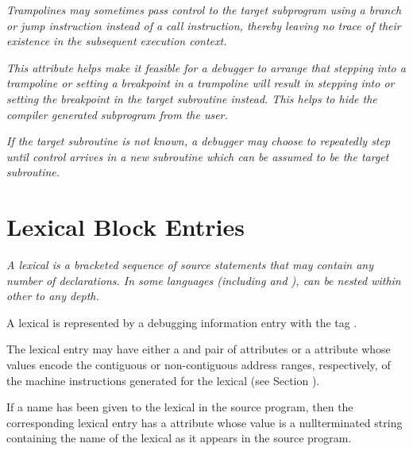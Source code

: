 \textit{Trampolines may sometimes pass control to the target
subprogram using a branch or jump instruction instead of a
call instruction, thereby leaving no trace of their existence
in the subsequent execution context. }

\textit{This attribute helps make it feasible for a debugger to arrange
that stepping into a trampoline or setting a breakpoint in
a trampoline will result in stepping into or setting the
breakpoint in the target subroutine instead. This helps to
hide the compiler generated subprogram from the user. }

\textit{If the target subroutine is not known, a debugger may choose
to repeatedly step until control arrives in a new subroutine
which can be assumed to be the target subroutine. }



\section{Lexical Block Entries}
\label{chap:lexicalblockentries}

\textit{A lexical  is a bracketed sequence of source statements
that may contain any number of declarations. In some languages
(including  and ),
 can be nested within other
 to any depth.}

A lexical  is represented by a debugging information
entry with the 
tag .

The lexical  entry
may have 
either a  and
 pair of 
attributes 
or 
a 
 attribute
whose values encode the contiguous or non-contiguous address
ranges, respectively, of the machine instructions generated
for the lexical  
(see Section ).

If a name has been given to the 
lexical  
in the source
program, then the corresponding 
lexical  entry has a
 attribute whose 
value is a null\dash terminated string
containing the name of the lexical  
as it appears in
the source program.

